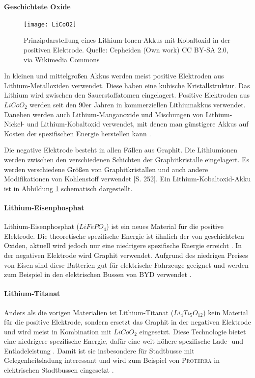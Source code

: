 \paragraph{Geschichtete Oxide}

\begin{figure}\centering
	\texttt{[image: LiCoO2]}
	\caption{Prinzipdarstellung eines Lithium-Ionen-Akkus mit Kobaltoxid in der positiven Elektrode. Quelle: Cepheiden (Own work) CC BY-SA 2.0, via Wikimedia Commons} %
	\label{abb_LiCoO2}
\end{figure}

In kleinen und mittelgroßen Akkus werden meist positive Elektroden aus Lithium-Metalloxiden verwendet. Diese haben eine kubische Kristallstruktur. Das Lithium wird zwischen den Sauerstoffatomen eingelagert. Positive Elektroden aus $LiCoO_2$ werden seit den 90er Jahren in kommerziellen Lithiumakkus verwendet. Daneben werden auch Lithium-Manganoxide und Mischungen von Lithium-Nickel- und Lithium-Kobaltoxid verwendet, mit denen man günstigere Akkus auf Kosten der spezifischen Energie herstellen kann \cite{whittingham2004lithium}. %

Die negative Elektrode besteht in allen Fällen aus Graphit. Die Lithiumionen werden zwischen den verschiedenen Schichten der Graphitkristalle eingelagert. Es werden verschiedene Größen von Graphitkristallen und auch andere Modifikationen von Kohlenstoff verwendet \cite{Sterner:2014}[S. 252]. Ein Lithium-Kobaltoxid-Akku ist in Abbildung \ref{abb_LiCoO2} schematisch dargestellt.

\paragraph{Lithium-Eisenphosphat}
Lithium-Eisenphosphat ($LiFePO_4$) ist ein neues Material für die positive Elektrode. Die theoretische spezifische Energie ist ähnlich der von geschichteten Oxiden, aktuell wird jedoch nur eine niedrigere spezifische Energie erreicht \cite{Tie201382}. In der negativen Elektrode wird Graphit verwendet. Aufgrund des niedrigen Preises von Eisen sind diese Batterien gut für elektrische Fahrzeuge geeignet und werden zum Beispiel in den elektrischen Bussen von \textsc{BYD} verwendet \cite{bydSpecs}.

\paragraph{Lithium-Titanat}
Anders als die vorigen Materialien ist Lithium-Titanat ($Li_4Ti_5O_{12}$) kein Material für die positive Elektrode, sondern ersetzt das Graphit in der negativen Elektrode und wird meist in Kombination mit $LiCoO_2$ eingesetzt. Diese Technologie bietet eine niedrigere spezifische Energie, dafür eine weit höhere spezifische Lade- und Entladeleistung \cite{veneri2012charging}. Damit ist sie insbesondere für Stadtbusse mit Gelegenheitsladung interessant und wird zum Beispiel von \textsc{Proterra} in elektrischen Stadtbussen eingesetzt \cite{protCat}.  

